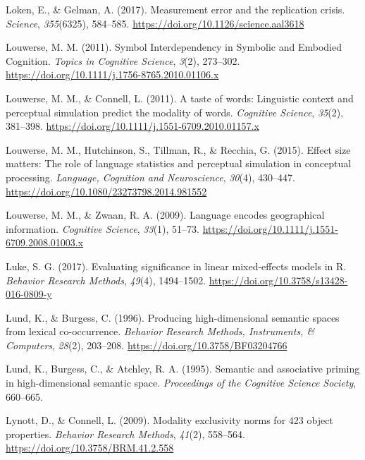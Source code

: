 \documentclass[
  12pt,
  man,floatsintext]{apa7}
\newlength{\cslhangindent}
\newlength{\cslentryspacingunit} %
\newenvironment{CSLReferences}[2] %
 {%
  \setlength{\parindent}{0pt}
  \ifodd #1
  \let\oldpar\par
  \def\par{\hangindent=\cslhangindent\oldpar}
  \fi
  \setlength{\parskip}{#2\cslentryspacingunit}
 }%
 {}
\begin{document}
\begin{CSLReferences}{1}{0}
\leavevmode{}%
Loken, E., \& Gelman, A. (2017). Measurement error and the replication crisis. \emph{Science}, \emph{355}(6325), 584--585. \url{https://doi.org/10.1126/science.aal3618}

\leavevmode{}%
Louwerse, M. M. (2011). Symbol {Interdependency} in {Symbolic} and {Embodied Cognition}. \emph{Topics in Cognitive Science}, \emph{3}(2), 273--302. \url{https://doi.org/10.1111/j.1756-8765.2010.01106.x}

\leavevmode{}%
Louwerse, M. M., \& Connell, L. (2011). A taste of words: Linguistic context and perceptual simulation predict the modality of words. \emph{Cognitive Science}, \emph{35}(2), 381--398. \url{https://doi.org/10.1111/j.1551-6709.2010.01157.x}

\leavevmode{}%
Louwerse, M. M., Hutchinson, S., Tillman, R., \& Recchia, G. (2015). Effect size matters: {The} role of language statistics and perceptual simulation in conceptual processing. \emph{Language, Cognition and Neuroscience}, \emph{30}(4), 430--447. \url{https://doi.org/10.1080/23273798.2014.981552}

\leavevmode{}%
Louwerse, M. M., \& Zwaan, R. A. (2009). Language encodes geographical information. \emph{Cognitive Science}, \emph{33}(1), 51--73. \url{https://doi.org/10.1111/j.1551-6709.2008.01003.x}

\leavevmode{}%
Luke, S. G. (2017). Evaluating significance in linear mixed-effects models in {R}. \emph{Behavior Research Methods}, \emph{49}(4), 1494--1502. \url{https://doi.org/10.3758/s13428-016-0809-y}

\leavevmode{}%
Lund, K., \& Burgess, C. (1996). Producing high-dimensional semantic spaces from lexical co-occurrence. \emph{Behavior Research Methods, Instruments, \& Computers}, \emph{28}(2), 203--208. \url{https://doi.org/10.3758/BF03204766}

\leavevmode{}%
Lund, K., Burgess, C., \& Atchley, R. A. (1995). Semantic and associative priming in high-dimensional semantic space. \emph{Proceedings of the Cognitive Science Society}, 660--665.

\leavevmode{}%
Lynott, D., \& Connell, L. (2009). Modality exclusivity norms for 423 object properties. \emph{Behavior Research Methods}, \emph{41}(2), 558--564. \url{https://doi.org/10.3758/BRM.41.2.558}


\end{CSLReferences}
\end{document}

